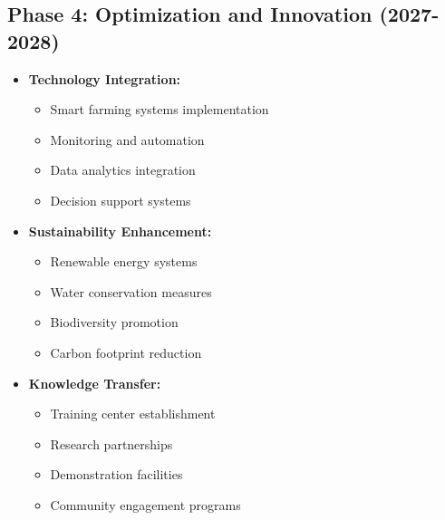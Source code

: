 \subsection{Phase 4: Optimization and Innovation (2027-2028)}
\begin{itemize}
    \item \textbf{Technology Integration:}
    \begin{itemize}
        \item Smart farming systems implementation
        \item Monitoring and automation
        \item Data analytics integration
        \item Decision support systems
    \end{itemize}
    
    \item \textbf{Sustainability Enhancement:}
    \begin{itemize}
        \item Renewable energy systems
        \item Water conservation measures
        \item Biodiversity promotion
        \item Carbon footprint reduction
    \end{itemize}
    
    \item \textbf{Knowledge Transfer:}
    \begin{itemize}
        \item Training center establishment
        \item Research partnerships
        \item Demonstration facilities
        \item Community engagement programs
    \end{itemize}
\end{itemize}


